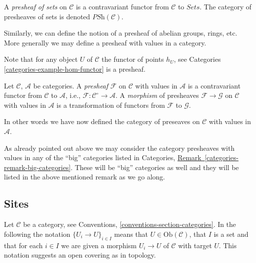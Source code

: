 \begin{definition}
\label{definition-presheaves-sets}
A {\it presheaf of sets} on $\mathcal{C}$ is a contravariant
functor from $\mathcal{C}$ to $\textit{Sets}$. The category
of presheaves of sets is denoted $\textit{PSh}(\mathcal{C})$.
\end{definition}

\noindent
Similarly, we can define the notion of a presheaf of abelian groups,
rings, etc. More generally we may define a presheaf with values in a
category.

\medskip\noindent
Note that for any object $U$ of $\mathcal{C}$ the functor of
points $h_U$, see Categories \autoref{categories-example-hom-functor}
is a presheaf.

\begin{definition}
\label{definition-presheaf}
Let $\mathcal{C}$, $\mathcal{A}$ be categories.
A {\it presheaf} $\mathcal{F}$ on $\mathcal{C}$
with values in $\mathcal{A}$ is a contravariant
functor from $\mathcal{C}$ to $\mathcal{A}$,
i.e., $\mathcal{F} : \mathcal{C}^\circ \to \mathcal{A}$.
A {\it morphism} of presheaves $\mathcal{F} \to \mathcal{G}$
on $\mathcal{C}$ with values in $\mathcal{A}$ is a transformation
of functors from $\mathcal{F}$ to $\mathcal{G}$.
\end{definition}

\noindent
In other words we have now defined the category of preseaves
on $\mathcal{C}$ with values in $\mathcal{A}$.

\begin{remark}
\label{remark-big-presheaves}
As already pointed out above we may consider the category
presheaves with values in any of the ``big'' categories
listed in Categories, \hyperref[categories-remark-big-categories]%
{Remark~\ref*{categories-remark-big-categories}}.
These will be ``big'' categories as well and they will be
listed in the above mentioned remark as we go along.
\end{remark}

\subsection{Sites}
\label{subsection-sites-definitions}

\noindent
Let $\mathcal{C}$ be a category, see
Conventions, \autoref{conventions-section-categories}. 
In the following the notation $\{U_i \to U\}_{i\in I}$ means that 
$U \in \text{Ob}(\mathcal{C})$, that $I$ is a set and that for each $i\in I$ 
we are given a morphism $U_i \to U$ of $\mathcal{C}$ with target $U$. This
notation suggests an open covering as in topology.

